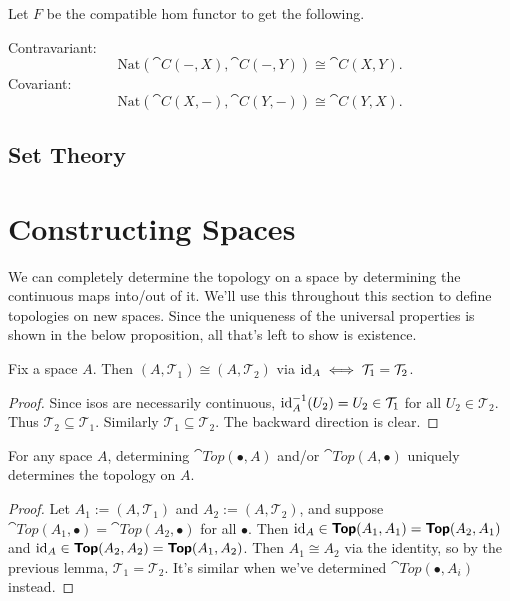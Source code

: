 \documentclass[twoside,10pt]{report}
\begin{document}
\begin{cor}
	Let $F$ be the compatible hom functor to get the following.

\noindent Contravariant:
\[
\text{Nat}\left( \cat{C}(-,X), \cat{C}(-,Y) \right) \cong \cat{C}(X,Y).
\] 
Covariant:
\[
\text{Nat}\left( \cat{C}(X,-), \cat{C}(Y,-) \right) \cong \cat{C}(Y,X).
\] 
\end{cor}

\section{Set Theory}



\chapter{Constructing Spaces}

We can completely determine the topology on a space by determining the continuous maps into/out of it. We'll use this throughout this section to define topologies on new spaces. Since the uniqueness of the universal properties is shown in the below proposition, all that's left to show is existence.

\begin{lem}
Fix a space $A$. Then $(A, \mathcal{T}_1) \cong (A, \mathcal{T}_2)$ via $\operatorname{id}_{A} \iff \mathcal{T}_1 = \mathcal{T}_2$.
\end{lem}
\begin{proof}
	Since isos are necessarily continuous, $\operatorname{id}_{A}^{-1}(U_2) = U_2 \in \mathcal{T}_{1}$ for all $U_2 \in \mathcal{T}_{2}$. Thus $\mathcal{T}_{2} \subseteq \mathcal{T}_{1}$. Similarly $\mathcal{T}_{1} \subseteq \mathcal{T}_{2}$. The backward direction is clear.
\end{proof}

\begin{prop}
For any space $A$, determining $\cat{Top}(\bullet,A)$ and/or $\cat{Top}(A,\bullet)$ uniquely determines the topology on $A$.
\end{prop}
\begin{proof}
	Let $A_1 := (A,\mathcal{T}_{1})$ and $A_2:=(A,\mathcal{T}_{2})$, and suppose $\cat{Top}(A_1,\bullet) = \cat{Top}(A_2,\bullet)$ for all $\bullet$. Then $\operatorname{id}_{A} \in \text{\sffamily\textbf{Top}}(A_1,A_1) = \text{\sffamily\textbf{Top}}(A_2,A_1)$ and $\operatorname{id}_{A}\in \text{\sffamily\textbf{Top}}(A_2,A_2) = \text{\sffamily\textbf{Top}}(A_1,A_2)$. Then $A_1 \cong A_2$ via the identity, so by the previous lemma, $\mathcal{T}_1 = \mathcal{T}_{2}$. It's similar when we've determined $\cat{Top}(\bullet,A_{i})$ instead.
\end{proof}
\end{document}
